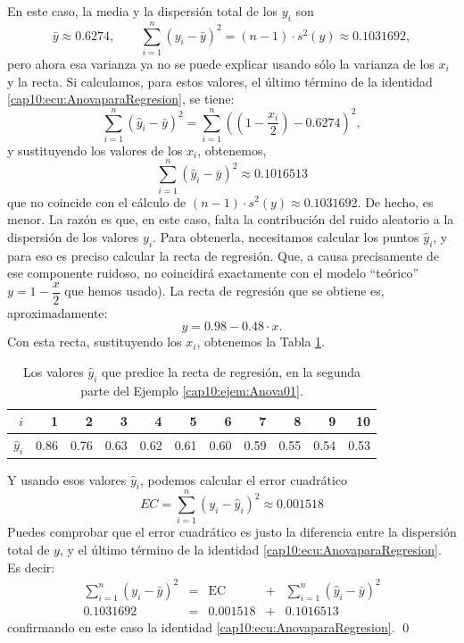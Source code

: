 \begin{ejemplo}
\noindent En este caso, la media y la dispersión total de los $y_i$ son
\[\bar y\approx 0.6274,\qquad \displaystyle\sum_{i=1}^{n}(y_i-\bar y)^2=(n-1)\cdot s^2(y)\approx 0.1031692,\]
pero ahora esa varianza ya no se puede explicar usando sólo la varianza de los $x_i$ y la recta. Si calculamos, para estos valores, el último término de la identidad \ref{cap10:ecu:AnovaparaRegresion}, se tiene:
\[\sum_{i=1}^n(\hat y_i-\bar y)^2=\sum_{i=1}^n\left((1-\dfrac{x_i}{2})-0.6274\right)^2,\]
y sustituyendo los valores de los $x_i$, obtenemos,
\[\sum_{i=1}^n(\hat y_i-\bar y)^2\approx 0.1016513\]
que no coincide con el cálculo de $(n-1)\cdot s^2(y)\approx 0.1031692$. De hecho, es menor. La razón es que, en este caso, falta la contribución del ruido aleatorio a la dispersión de los valores $y_i$. Para obtenerla, necesitamos calcular los puntos $\hat y_i$, y para eso es preciso calcular la recta de regresión. Que, a causa precisamente de ese componente ruidoso, no coincidirá exactamente con el modelo ``teórico'' $y=1-\dfrac{x}{2}$ que hemos usado). La recta de regresión que se obtiene es, aproximadamente:
\[y=0.98-0.48\cdot x.\]
Con esta recta, sustituyendo los $x_i$, obtenemos la Tabla \ref{cap10:tabla:Anova01predichos}.
\begin{table}[htb]
\centering
\begin{tabular}{rrrrrrrrrrr}
  \hline
$i$ & 1 & 2 & 3 & 4 & 5 & 6 & 7 & 8 & 9 & 10 \\
  \hline
$\hat y_i$ & 0.86 & 0.76 & 0.63 & 0.62 & 0.61 & 0.60 & 0.59 & 0.55 & 0.54 & 0.53 \\
   \hline
\end{tabular}
\label{cap10:tabla:Anova01predichos}
\caption{Los valores $\hat y_i$ que predice la recta de regresión, en la segunda parte del Ejemplo \ref{cap10:ejem:Anova01}. }
\end{table}
Y usando esos valores $\hat y_i$, podemos calcular el error cuadrático
\[EC=\sum_{i=1}^n(y_i-\hat y_i)^2\approx 0.001518\]
Puedes comprobar que el error cuadrático es justo la diferencia entre la dispersión total de $y$, y el último término de la identidad \ref{cap10:ecu:AnovaparaRegresion}. Es decir:
\[
\begin{array}{ccccc}
 \displaystyle\sum_{i=1}^{n}(y_i-\bar y)^2 &=&\mbox{EC} & + & \sum_{i=1}^n(\hat y_i-\bar y)^2\\
                  0.1031692                &=&0.001518  & + &          0.1016513
\end{array}
\]
confirmando en este caso la identidad \ref{cap10:ecu:AnovaparaRegresion}.
\qed
\end{ejemplo}

